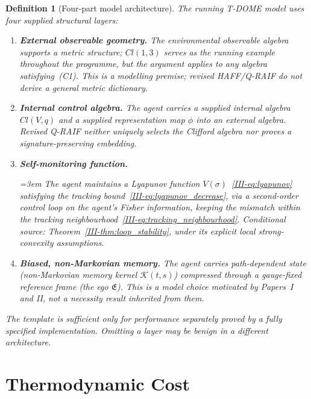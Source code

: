 \documentclass[12pt,a4paper,openany]{book}
\newtheorem{definition}[theorem]{Definition}
\begin{document}
\begin{definition}[Four-part model architecture]
\label{III-def:four_part_template}
The running T-DOME model uses four supplied structural layers:
\begin{enumerate}
\item[\textup{(I)}] \textbf{External observable geometry.}
  The environmental observable algebra supports a
  metric structure; $Cl(1,3)$ serves as the running
  example throughout the programme, but the argument
  applies to any algebra satisfying~(C1).
  This is a modelling premise; revised HAFF/Q-RAIF do not derive a
  general metric dictionary.
\item[\textup{(II)}] \textbf{Internal control algebra.}
  The agent carries a supplied internal algebra $Cl(V,q)$ and a
  supplied representation map $\phi$ into an external algebra.
  Revised Q-RAIF neither uniquely selects the Clifford algebra nor
  proves a signature-preserving embedding.
\item[\textup{(III)}] \textbf{Self-monitoring function.}
  {\emergencystretch=3em
  The agent maintains a Lyapunov function
  $V(\sigma)$~\eqref{III-eq:lyapunov} satisfying
  the tracking
  bound~\eqref{III-eq:lyapunov_decrease},
  via a second-order control loop on the agent's
  Fisher information, keeping the mismatch within
  the tracking
  neighbourhood~\eqref{III-eq:tracking_neighbourhood}.
  \emph{Conditional source:} Theorem~\ref{III-thm:loop_stability}, under
  its explicit local strong-convexity assumptions.\par}
\item[\textup{(IV)}] \textbf{Biased, non-Markovian memory.}
  The agent carries path-dependent state
  (non-Markovian memory kernel $\mathcal{K}(t,s)$)
  compressed through a gauge-fixed reference frame
  (the ego $\mathfrak{E}$).
  This is a model choice motivated by Papers~I and II, not a necessity
  result inherited from them.
\end{enumerate}
The template is sufficient only for performance separately proved by a
fully specified implementation.  Omitting a layer may be benign in a
different architecture.
\end{definition}

\section{Thermodynamic Cost}
\label{III-sec:cost}

\end{document}
